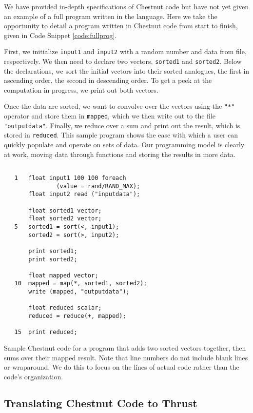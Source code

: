 \documentclass[twocolumn]{article}
\renewcommand{\|}{\origbar} %
\newcommand{\code}[1]{\texttt{#1}}
\begin{document}
We have provided in-depth specifications of Chestnut code but have not yet given an example of a full program written in the language. Here we take the opportunity to detail a program written in Chestnut code from start to finish, given in Code Snippet \ref{code:fullprog}.

First, we initialize \code{input1} and \code{input2} with a random number and data from file, respectively. We then need to declare two vectors, \code{sorted1} and \code{sorted2}. Below the declarations, we sort the initial vectors into their sorted analogues, the first in ascending order, the second in descending order. To get a peek at the computation in progress, we print out both vectors.

Once the data are sorted, we want to convolve over the vectors using the \code{"*"} operator and store them in \code{mapped}, which we then write out to the file \code{"outputdata"}. Finally, we reduce over a sum and print out the result, which is stored in \code{reduced}. This sample program shows the ease with which a user can quickly populate and operate on sets of data. Our programming model is clearly at work, moving data through functions and storing the results in more data.

\begin{Code Snippet}
\begin{verbatim}

   1   float input1 100 100 foreach 
               (value = rand/RAND_MAX);
       float input2 read ("inputdata");
   
       float sorted1 vector;
       float sorted2 vector;
   5   sorted1 = sort(<, input1);
       sorted2 = sort(>, input2);
   
       print sorted1;
       print sorted2;
   
       float mapped vector;
   10  mapped = map(*, sorted1, sorted2);
       write (mapped, "outputdata");
     
       float reduced scalar;
       reduced = reduce(+, mapped);
   
   15  print reduced;
\end{verbatim}
\caption{Sample Chestnut code for a program that adds two sorted vectors together, then sums over their mapped result. Note that line numbers do not include blank lines or wraparound. We do this to focus on the lines of actual code rather than the code's organization.}
\label{code:fullprog}
\end{Code Snippet}

\subsection{Translating Chestnut Code to Thrust}
\label{sec:chestnutToThrust}
\end{document}
